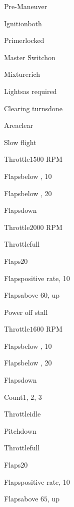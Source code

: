 




\begin{multicols}{2}
\begin{checklist}{Pre-Maneuver}
    \item{Ignition}{both}
    \item{Primer}{locked}
    \item{Master Switch}{on}
    \item{Mixture}{rich}
    \item{Lights}{as required}
    \item{Clearing turns}{done}
    \item{Area}{clear}
\end{checklist}

\begin{checklist}{Slow flight}
  \item{Throttle}{$1500$ RPM}
  \item{Flaps}{below \vfe, 10\degree}
  \item{Flaps}{below \vfe, 20\degree}
  \item{Flaps}{down}
  \item{Throttle}{$2000$ RPM}
  \item{Throttle}{full}
  \item{Flaps}{20\degree}
  \item{Flaps}{positive rate, 10\degree}
  \item{Flaps}{above 60, up}
\end{checklist}

\begin{checklist}{Power off stall}
  \item{Throttle}{$1600$ RPM}
  \item{Flaps}{below \vfe, 10\degree}
  \item{Flaps}{below \vfe, 20\degree}
  \item{Flaps}{down}
  \item{Count}{1, 2, 3}
  \item{Throttle}{idle}
  \item{Pitch}{down}
  \item{Throttle}{full}
  \item{Flaps}{20\degree}
  \item{Flaps}{positive rate, 10\degree}
  \item{Flaps}{above $65$, up}
\end{checklist}


\end{multicols}
